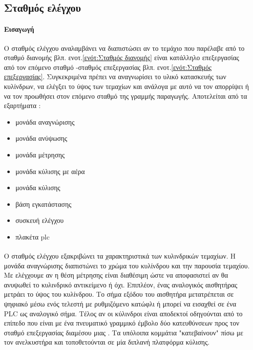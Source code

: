 \documentclass[a4paper,12pt,twoside]{report}
\begin{document}
{%
			\FloatBarrier
			\subsection{Σταθμός ελέγχου \cite{FestoMPSTestingStationManual} \cite{ΤοΦυσικόΣύστημαFestoMPS} \cite{UMLΕνσωματωμέναΣυστήματα}}
			
			\label{ενότ:Σταθμός ελέγχου}
				\paragraph{Εισαγωγή} {Ο σταθμός ελέγχου αναλαμβάνει να διαπιστώσει αν το τεμάχιο που παρέλαβε από το σταθμό διανομής {\footnotesize βλπ. ενοτ.\ref{ενότ:Σταθμός διανομής}} είναι κατάλληλο επεξεργασίας από τον επόμενο σταθμό -σταθμός επεξεργασίας {\footnotesize βλπ. ενοτ.\ref{ενότ:Σταθμός επεξεργασίας}}. Συγκεκριμένα πρέπει να αναγνωρίσει το υλικό κατασκευής των κυλίνδρων, να ελέγξει το ύψος των τεμαχίων και ανάλογα με αυτό να τον απορρίψει  ή να τον προωθήσει στον επόμενο σταθμό της γραμμής παραγωγής. Αποτελείται από τα εξαρτήματα :
				}
				\begin{itemize}
					\item μονάδα αναγνώρισης
					\item μονάδα ανύψωσης
					\item μονάδα μέτρησης
					\item μονάδα κύλισης με αέρα
					\item μονάδα κύλισης
					\item βάση εγκατάστασης
					\item συσκευή ελέγχου
					\item πλακέτα plc
				\end{itemize}
				\paragraph{} {Ο σταθμός ελέγχου εξακριβώνει τα χαρακτηριστικά των κυλινδρικών τεμαχίων. Η μονάδα αναγνώρισης διαπιστώνει το χρώμα του κυλίνδρου και την παρουσία τεμαχίου. Με  ελέγχουμε αν η θέση μέτρησης είναι διαθέσιμη ώστε να αποφασιστεί αν θα ανυψωθεί το κυλινδρικό αντικείμενο ή όχι. Επιπλέον, ένας \gls{αναλογικός αισθητήρας} μετράει το ύψος του κυλίνδρου. Το σήμα εξόδου του αισθητήρα μετατρέπεται σε ψηφιακό μέσω ενός τελεστή με ρυθμιζόμενο κατώφλι ή μπορεί να εισαχθεί σε ένα PLC ως αναλογικό σήμα. Τέλος αν οι κύλινδροι είναι αποδεκτοί οδηγούνται από το επίπεδο που είναι με ένα πνευματικό \gls{γραμμικό έμβολο} δύο κατευθύνσεων προς τον σταθμό επεξεργασίας διαμέσου μιας . Τα υπόλοιπα κομμάτια "κατεβαίνουν" πίσω με τον ανελκυστήρα και τοποθετούνται σε μία διπλανή \gls{πλατφόρμα κύλισης}.
				}
				
}
\end{document}
